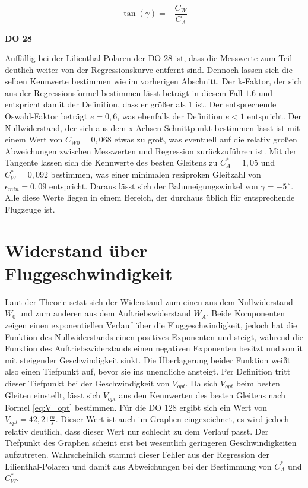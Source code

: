 \begin{equation}
\tan\left(\gamma\right)=-\frac{C_W}{C_A}
\label{Bahn}
\end{equation}

\textbf{DO 28}

Auffällig bei der Lilienthal-Polaren der DO 28 ist, dass die Messwerte zum Teil deutlich weiter von der Regressionskurve entfernt sind. Dennoch lassen sich die selben Kennwerte bestimmen wie im vorherigen Abschnitt. 
Der k-Faktor, der sich aus der Regressionsformel bestimmen lässt beträgt in diesem Fall $1.6$ und entspricht damit der Definition, dass er größer als 1 ist. Der entsprechende Oswald-Faktor beträgt $e = 0,6$, was ebenfalls der Definition $e<1$ entspricht. 
Der Nullwiderstand, der sich aus dem x-Achsen Schnittpunkt bestimmen lässt ist mit einem Wert von $C_{W0} = 0,068$ etwas zu groß, was eventuell auf die relativ großen Abweichungen zwischen Messwerten und Regression zurückzuführen ist.
Mit der Tangente lassen sich die Kennwerte des besten Gleitens zu $C_A^* = 1,05$ und $C_W^* = 0,092$ bestimmen, was einer minimalen reziproken Gleitzahl von $\epsilon_{min} = 0,09$ entspricht. Daraus lässt sich der Bahnneigungswinkel von $\gamma = -5^{\ \circ}$. Alle diese Werte liegen in einem Bereich, der durchaus üblich für entsprechende Flugzeuge ist.


\section{Widerstand über Fluggeschwindigkeit}
Laut der Theorie setzt sich der Widerstand zum einen aus dem Nullwiderstand $W_0$ und zum anderen aus dem Auftriebswiderstand $W_A$. Beide Komponenten zeigen einen exponentiellen Verlauf über die Fluggeschwindigkeit, jedoch hat die Funktion des Nullwiderstands einen positives Exponenten und steigt, während die Funktion des Auftriebswiderstands einen negativen Exponenten besitzt und somit mit steigender Geschwindigkeit sinkt. Die Überlagerung beider Funktion weißt also einen Tiefpunkt auf, bevor sie ins unendliche ansteigt. Per Definition tritt dieser Tiefpunkt bei der Geschwindigkeit von $V_{opt}$. Da sich $V_{opt}$ beim besten Gleiten einstellt, lässt sich $V_{opt}$ aus den Kennwerten des besten Gleitens nach Formel \ref{eq:V_opt} bestimmen. Für die DO 128 ergibt sich ein Wert von $V_{opt} = 42,21 \frac{m}{s}$. Dieser Wert ist auch im Graphen eingezeichnet, es wird jedoch relativ deutlich, dass dieser Wert nur schlecht zu dem Verlauf passt. Der Tiefpunkt des Graphen scheint erst bei wesentlich geringeren Geschwindigkeiten aufzutreten. Wahrscheinlich stammt dieser Fehler aus der Regression der Lilienthal-Polaren und damit aus Abweichungen bei der Bestimmung von $C_A^*$ und $C_W^*$.

